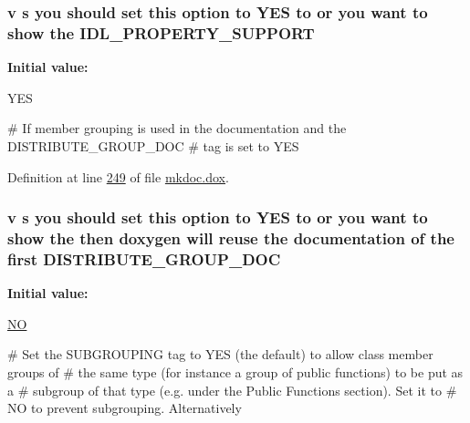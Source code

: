\hypertarget{mkdoc_8dox_a09c760dfd058001a9247df20dd282ea2}{
\subsubsection[{I\-D\-L\-\_\-\-P\-R\-O\-P\-E\-R\-T\-Y\-\_\-\-S\-U\-P\-P\-O\-R\-T}]{\setlength{\rightskip}{0pt plus 5cm}v s you should set this option to Y\-E\-S to or you want to show the I\-D\-L\-\_\-\-P\-R\-O\-P\-E\-R\-T\-Y\-\_\-\-S\-U\-P\-P\-O\-R\-T}}\label{mkdoc_8dox_a09c760dfd058001a9247df20dd282ea2}
{\bfseries Initial value\-:}
\begin{DoxyCode}
 YES

\textcolor{preprocessor}{# If member grouping is used in the documentation and the DISTRIBUTE\_GROUP\_DOC }
\textcolor{preprocessor}{# tag is set to YES}
\end{DoxyCode}


Definition at line \hyperlink{mkdoc_8dox_source_l00249}{249} of file \hyperlink{mkdoc_8dox_source}{mkdoc.\-dox}.

\hypertarget{mkdoc_8dox_a2d6cc054818b29cdad766ec1e51d30f0}{
\subsubsection[{D\-I\-S\-T\-R\-I\-B\-U\-T\-E\-\_\-\-G\-R\-O\-U\-P\-\_\-\-D\-O\-C}]{\setlength{\rightskip}{0pt plus 5cm}v s you should set this option to Y\-E\-S to or you want to show the then doxygen will reuse the documentation of the first D\-I\-S\-T\-R\-I\-B\-U\-T\-E\-\_\-\-G\-R\-O\-U\-P\-\_\-\-D\-O\-C}}\label{mkdoc_8dox_a2d6cc054818b29cdad766ec1e51d30f0}
{\bfseries Initial value\-:}
\begin{DoxyCode}
 \hyperlink{mkdoc_8dox_a0f6a46245280dc38baf9600906aa1393}{NO}

\textcolor{preprocessor}{# Set the SUBGROUPING tag to YES (the default) to allow class member groups of }
\textcolor{preprocessor}{}\textcolor{preprocessor}{# the same type (for instance a group of public functions) to be put as a }
\textcolor{preprocessor}{}\textcolor{preprocessor}{# subgroup of that type (e.g. under the Public Functions section). Set it to }
\textcolor{preprocessor}{# NO to prevent subgrouping. Alternatively}
\end{DoxyCode}


